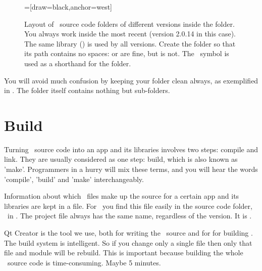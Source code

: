 \begin {figure} [ht]
\centering
{}=[draw=black,anchor=west]
\caption{Layout of \US\ source code folders of different versions inside the  folder. You always work inside the most recent (version 2.0.14 in this case). The same  library () is used by all versions. Create the  folder so that its path contains no spaces:  or  are fine, but  is not. The \devhome\ symbol is used as a shorthand for the  folder.}
\label{fig:unisim-versions}
\end{figure}

You will avoid much confusion by keeping your  folder clean always, as exemplified in . The  folder itself contains nothing but sub-folders.

\section{Build \protect\US}
Turning \CPP\ source code into an app and its libraries involves two steps: compile and link. They are usually considered as one step: build, which is also known as 'make'. Programmers in a hurry will mix these terms, and you will hear the words 'compile', 'build' and 'make' interchangeably.

Information about which \CPP\ files make up the source for a certain app and its libraries are kept in a  file. For \US\ you find this file easily in the source code folder, \eg\ in . The project file always has the same name, regardless of the version. It is .

Qt Creator is the tool we use, both for writing the \CPP\ source and for for building \US. The build system is intelligent. So if you change only a single file then only that file and module will be rebuild. This is important because building the whole \US\ source code is time-consuming. Maybe 5 minutes.

